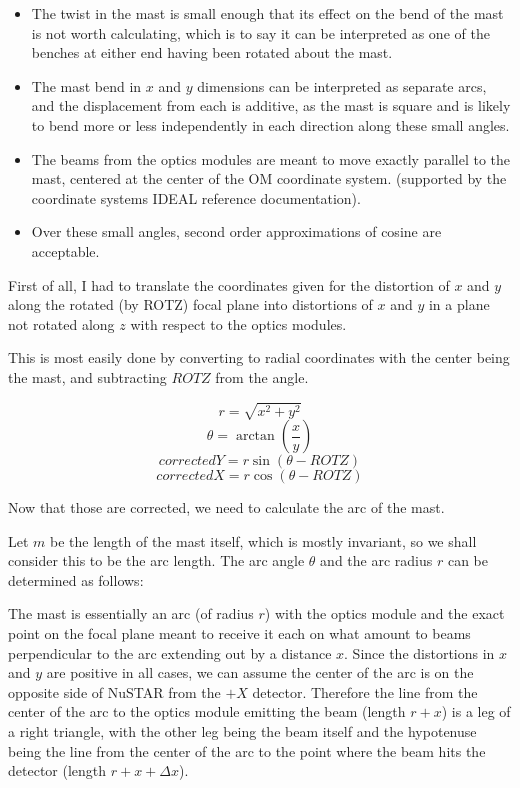 \begin{itemize}
    \item The twist in the mast is small enough that its effect on the bend of the mast is not worth calculating, which is to say it can be interpreted as one of the benches at either end having been rotated about the mast.
    \item The mast bend in $x$ and $y$ dimensions can be interpreted as separate arcs, and the displacement from each is additive, as the mast is square and is likely to bend more or less independently in each direction along these small angles. 
    \item The beams from the optics modules are meant to move exactly parallel to the mast, centered at the center of the OM coordinate system. (supported by the coordinate systems IDEAL reference documentation).
    \item Over these small angles, second order approximations of cosine are acceptable. 
\end{itemize}

First of all, I had to translate the coordinates given for the distortion of $x$ and $y$ along the rotated (by ROTZ) focal plane into distortions of $x$ and $y$ in a plane not rotated along $z$ with respect to the optics modules. 

This is most easily done by converting to radial coordinates with the center being the mast, and subtracting $ROTZ$ from the angle.

\[
r = \sqrt{x^2+y^2}
\]
\[
\theta = \arctan \left(\frac{x}{y}\right)
\]
\[
correctedY = r \sin \left(\theta-ROTZ\right)
\]
\[
correctedX = r \cos \left(\theta-ROTZ\right)
\]

Now that those are corrected, we need to calculate the arc of the mast.

Let $m$ be the length of the mast itself, which is mostly invariant, so we shall consider this to be the arc length. The arc angle $\theta$ and the arc radius $r$ can be determined as follows:

The mast is essentially an arc (of radius $r$) with the optics module and the exact point on the focal plane meant to receive it each on what amount to beams perpendicular to the arc extending out by a distance $x$. Since the distortions in $x$ and $y$ are positive in all cases, we can assume the center of the arc is on the opposite side of NuSTAR from the $+X$ detector. Therefore the line from the center of the arc to the optics module emitting the beam (length $r+x$) is a leg of a right triangle, with the other leg being the beam itself and the hypotenuse being the line from the center of the arc to the point where the beam hits the detector (length $r+x+\Delta x$).
